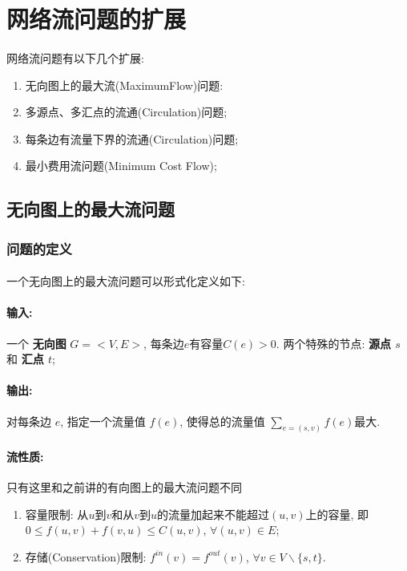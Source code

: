 \documentclass[a4paper]{article}
\begin{document}
    \section{网络流问题的扩展}
        \paragraph{}网络流问题有以下几个扩展:
        \begin{enumerate}
        \item 无向图上的最大流({\sc MaximumFlow})问题: 
        \item 多源点、多汇点的流通({\sc Circulation})问题;  
        \item 每条边有流量下界的流通({\sc Circulation})问题; 
        \item 最小费用流问题({\sc Minimum Cost Flow});
        \end{enumerate}
    \subsection{无向图上的最大流问题}
        \subsubsection*{问题的定义}
        \paragraph{}一个无向图上的最大流问题可以形式化定义如下:
        \paragraph{输入:}  一个 {\bf 无向图}  $G=<V, E>$, 每条边$e$有容量$C(e) > 0$. 两个特殊的节点: {\bf 源点 $s$} 和 {\bf 汇点 $t$}; 
\paragraph{输出:} 对每条边 $e$, 指定一个流量值 $f(e)$, 使得总的流量值 $\sum_{e=(s,v)} f(e)$最大.
        \paragraph{流性质:} 只有这里和之前讲的有向图上的最大流问题不同
        \begin{enumerate}
        \item{容量限制:}  从$u$到$v$和从$v$到$u$的流量加起来不能超过$(u, v)$上的容量, 即{\bf $0 \leq f(u, v) + f(v, u) \leq C(u, v)$},  $\forall(u,v) \in E$;
        \item{存储(Conservation)限制:}  $f^{in} (v) = f^{out} (v)$,  $\forall v\in V \backslash\{s, t\}$.
        \end{enumerate}
\end{document}

